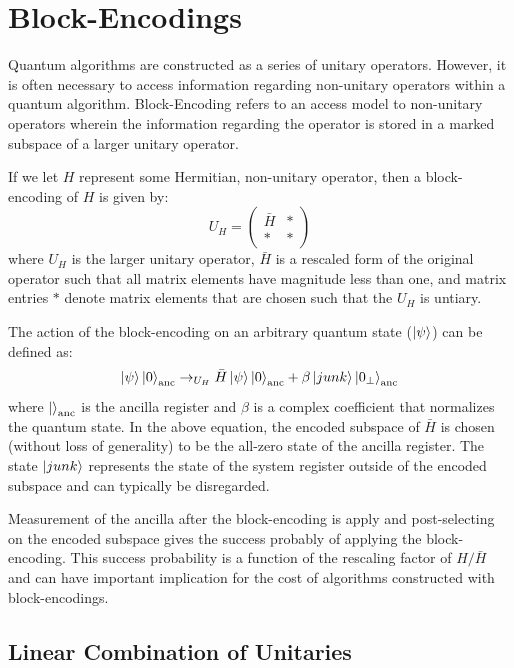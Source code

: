 \section{Block-Encodings}
\label{sec:block-encoding}

Quantum algorithms are constructed as a series of unitary operators.
However, it is often necessary to access information regarding non-unitary operators within a quantum algorithm.
Block-Encoding refers to an access model to non-unitary operators wherein the information regarding the operator is stored in a marked subspace of a larger unitary operator.

If we let $H$ represent some Hermitian, non-unitary operator, then a block-encoding of $H$ is given by:
\begin{equation}
    U_H = 
    \begin{pmatrix}
    \bar{H} & * \\
    * & * 
    \end{pmatrix}
\end{equation}
where $U_H$ is the larger unitary operator, $\bar{H}$ is a rescaled form of the original operator such that all matrix elements have magnitude less than one, and matrix entries $*$ denote matrix elements that are chosen such that the $U_H$ is untiary.

The action of the block-encoding on an arbitrary quantum state ($\ket{\psi}$) can be defined as:
\begin{equation}
    \ket{\psi} \ket{0}_{\text{anc}} \rightarrow_{U_H} \bar{H} \ket{\psi} \ket{0}_{\text{anc}} + \beta \ket{junk} \ket{0_\perp}_{\text{anc}}
\end{equation}
where $\ket{}_{\text{anc}}$ is the ancilla register and $\beta$ is a complex coefficient that normalizes the quantum state.
In the above equation, the encoded subspace of $\bar{H}$ is chosen (without loss of generality) to be the all-zero state of the ancilla register.
The state $\ket{junk}$ represents the state of the system register outside of the encoded subspace and can typically be disregarded.

Measurement of the ancilla after the block-encoding is apply and post-selecting on the encoded subspace gives the success probably of applying the block-encoding.
This success probability is a function of the rescaling factor of $H / \bar{H}$ and can have important implication for the cost of algorithms constructed with block-encodings.  

\subsection{Linear Combination of Unitaries}
\label{subsec:lcu}

